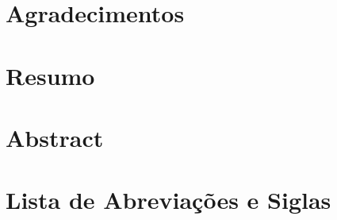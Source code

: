 \documentclass[12pt,a4paper]{report}
\begin{document}



  
  
  
  
  
  
  \chapter*{}
  
  
  \chapter*{Agradecimentos}
  
  
  \chapter*{Resumo}
  
  \chapter*{Abstract}
  

  \chapter*{Lista de Abreviações e Siglas}
  


  \listoffigures
  \listoftables
  \tableofcontents

  
\end{document}
